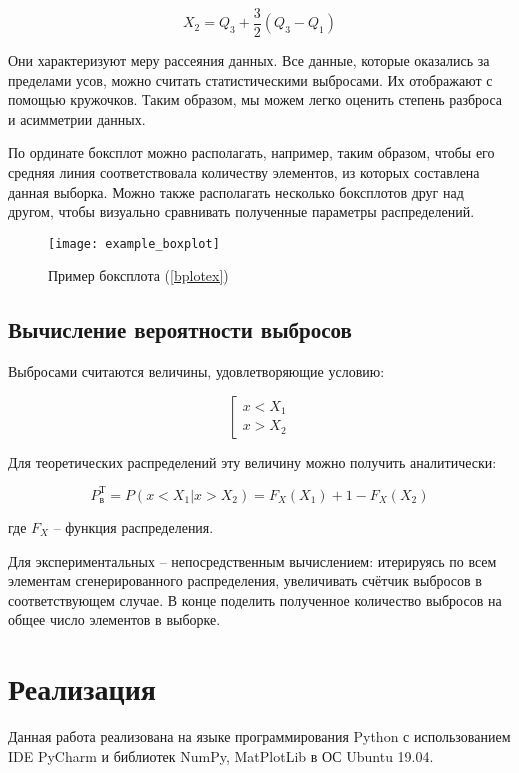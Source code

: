 \begin{equation}
	X_2 = Q_3 + \frac{3}{2}(Q_3-Q_1)
\end{equation}

Они характеризуют меру рассеяния данных. Все данные, которые оказались за пределами усов, можно считать статистическими выбросами. Их отображают с помощью кружочков. Таким образом, мы можем легко оценить степень разброса и асимметрии данных.

По ординате боксплот можно располагать, например, таким образом, чтобы его средняя линия соответствовала количеству элементов, из которых составлена данная выборка. Можно также располагать несколько боксплотов друг над другом, чтобы визуально сравнивать полученные параметры распределений.

\begin{figure}[H]
	\begin{center}
		\texttt{[image: example\_boxplot]}
		\caption{Пример боксплота (\ref{bplotex})}
		\label{pic:pic_name}	
	\end{center}
\end{figure}

\subsection{Вычисление вероятности выбросов}

Выбросами считаются величины, удовлетворяющие условию:


\begin{equation}
\left[
\begin{array}{c}
x < X_1 \\
x > X_2
\end{array}
\right.
\end{equation}

Для теоретических распределений эту величину можно получить аналитически:

\begin{equation}\label{trashdata}
P_{\text{в}}^{\text{Т}}=P(x<X_1 | x > X_2) = F_X(X_1) + 1 - F_X(X_2)
\end{equation}

где $F_X$ -- функция распределения.

Для экспериментальных -- непосредственным вычислением: итерируясь по всем элементам сгенерированного распределения, увеличивать счётчик выбросов в соответствующем случае. В конце поделить полученное количество выбросов на общее число элементов в выборке.
	
\section{Реализация}
Данная работа реализована на языке программирования Python с использованием IDE PyCharm и библиотек NumPy, MatPlotLib в ОС Ubuntu 19.04.

